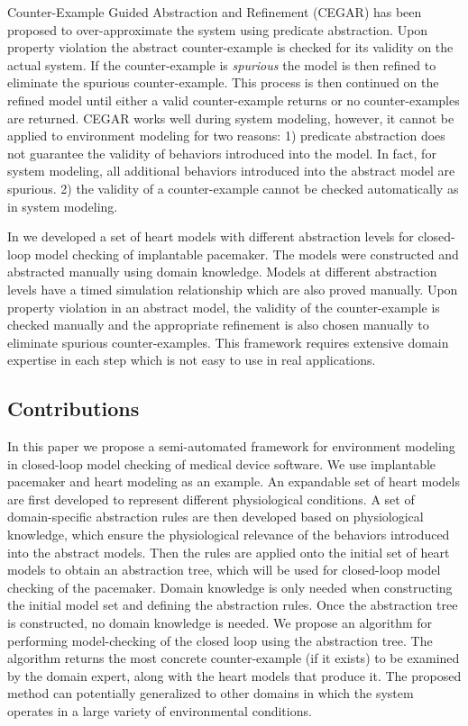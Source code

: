 Counter-Example Guided Abstraction and Refinement (CEGAR) \cite{CEGAR} has been proposed to over-approximate the system using predicate abstraction. Upon property violation the abstract counter-example is checked for its validity on the actual system. If the counter-example is \emph{spurious} the model is then refined to eliminate the spurious counter-example. This process is then continued on the refined model until either a valid counter-example returns or no counter-examples are returned. CEGAR works well during system modeling, however, it cannot be applied to environment modeling for two reasons: 1) predicate abstraction does not guarantee the validity of behaviors introduced into the model. In fact, for system modeling, all additional behaviors introduced into the abstract model are spurious. 2) the validity of a counter-example cannot be checked automatically as in system modeling.

In \cite{sttt13} we developed a set of heart models with different abstraction levels for closed-loop model checking of implantable pacemaker. The models were constructed and abstracted manually using domain knowledge. Models at different abstraction levels have a timed simulation relationship which are also proved manually. Upon property violation in an abstract model, the validity of the counter-example is checked manually and the appropriate refinement is also chosen manually to eliminate spurious counter-examples. This framework requires extensive domain expertise in each step which is not easy to use in real applications.

\subsection{Contributions}
In this paper we propose a semi-automated framework for environment modeling in closed-loop model checking of medical device software. 
We use implantable pacemaker and heart modeling as an example. 
An expandable set of heart models are first developed to represent different physiological conditions. 
A set of domain-specific abstraction rules are then developed based on physiological knowledge, which ensure the physiological relevance of the behaviors introduced into the abstract models. Then the rules are applied onto the initial set of heart models to obtain an abstraction tree, which will be used for closed-loop model checking of the pacemaker. 
Domain knowledge is only needed when constructing the initial model set and defining the abstraction rules. 
Once the abstraction tree is constructed, no domain knowledge is needed. 
We propose an algorithm for performing model-checking of the closed loop using the abstraction tree.
The algorithm returns the most concrete counter-example (if it exists) to be examined by the domain expert, along with the heart models that produce it.
The proposed method can potentially generalized to other domains in which the system operates in a large variety of environmental conditions.
%
